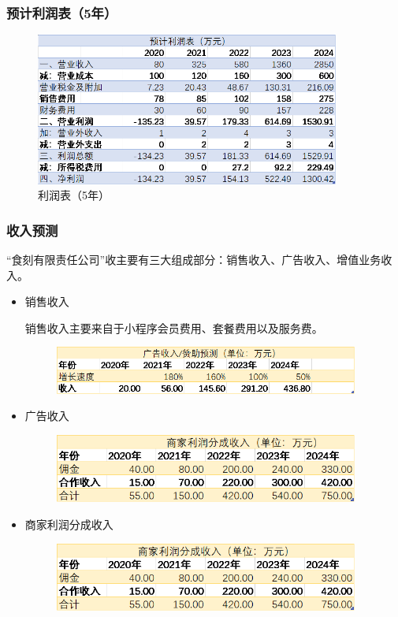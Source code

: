 \documentclass[UTF8,12pt]{ctexart}
\numberwithin{figure}{section}%
\begin{document}
\begin{spacing}{2}
\subsubsection{预计利润表（5年）}
\begin{figure}[!htb]
	\centering
	\includegraphics[width=10cm]{fig/27}
	\caption{利润表（5年）}
\end{figure}

\subsubsection{收入预测}

“食刻有限责任公司”收主要有三大组成部分：销售收入、广告收入、增值业务收入。

\begin{itemize}
	\item 销售收入
	
	销售收入主要来自于小程序会员费用、套餐费用以及服务费。
	\begin{figure}[!htb]
		\centering
		\includegraphics[width=10cm]{fig/28}
	\end{figure}
	
	\item 广告收入
	\begin{figure}[!htb]
		\centering
		\includegraphics[width=10cm]{fig/29}
	\end{figure}	
	
	\item 商家利润分成收入
	\begin{figure}[!htb]
		\centering
		\includegraphics[width=10cm]{fig/30}
	\end{figure}
	

\end{itemize}
\end{spacing}
\end{document}
